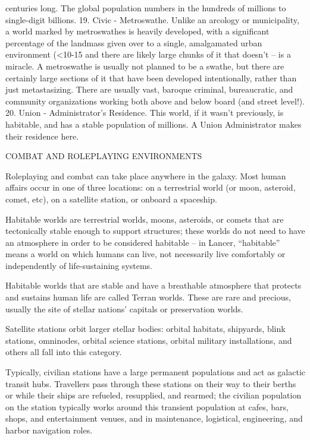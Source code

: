          centuries long. The global population numbers in the hundreds of millions to single-digit  
         billions.   
     19. Civic - Metroswathe. Unlike an arcology or municipality, a world marked by metroswathes  
         is heavily developed, with a significant percentage of the landmass given over to a single,  
         amalgamated urban environment (<10-15%
         and there are likely large chunks of it that doesn’t -- is a miracle. A metroswathe is usually  
         not planned to be a swathe, but there are certainly large sections of it that have been  
         developed intentionally, rather than just metastasizing. There are usually vast, baroque  
         criminal, bureaucratic, and community organizations working both above and below board  
         (and street level!).   
    20. Union - Administrator’s Residence. This world, if it wasn’t previously, is habitable, and has  
         a stable population of millions. A Union Administrator makes their residence here.    

COMBAT AND ROLEPLAYING ENVIRONMENTS  

Roleplaying and combat can take place anywhere in the galaxy. Most human affairs occur in one  
of three locations: on a terrestrial world (or moon, asteroid, comet, etc), on a satellite station, or  
onboard a spaceship. 
 

                                                                                                                    


Habitable worlds are terrestrial worlds, moons, asteroids, or comets that are tectonically stable  
enough to support structures; these worlds do not need to have an atmosphere in order to be  
considered habitable -- in Lancer, “habitable” means a world on which humans can live, not  
necessarily live comfortably or independently of life-sustaining systems. 
 

Habitable worlds that are stable and have a breathable atmosphere that protects and sustains  
human life are called Terran worlds. These are rare and precious, usually the site of stellar  
nations’ capitals or preservation worlds. 
 

Satellite stations orbit larger stellar bodies: orbital habitats, shipyards, blink stations, omninodes,  
orbital science stations, orbital military installations, and others all fall into this category. 
 

Typically, civilian stations have a large permanent populations and act as galactic transit hubs.  
Travellers pass through these stations on their way to their berths or while their ships are  
refueled, resupplied, and rearmed; the civilian population on the station typically works around  
this transient population at cafes, bars, shops, and entertainment venues, and in maintenance,  
logistical, engineering, and harbor navigation roles. 
 

